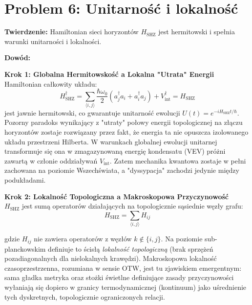 \documentclass[11pt,a4paper]{article}
\begin{document}
\bigskip

\section{Problem 6: Unitarność i lokalność}

\bigskip

\textbf{Twierdzenie:} Hamiltonian sieci horyzontów $H_{\text{SHZ}}$ jest hermitowski i spełnia warunki unitarności i lokalności.

\bigskip

\textbf{Dowód:}

\bigskip

\textbf{Krok 1: Globalna Hermitowskość a Lokalna "Utrata" Energii}\\

Hamiltonian całkowity układu:
\begin{equation}
H_{\text{SHZ}}^\dagger = \sum_{\langle i,j \rangle} \frac{\hbar\omega_0}{2}(a_j^\dagger a_i + a_i^\dagger a_j) + V_{\text{int}}^\dagger = H_{\text{SHZ}}
\end{equation}
jest jawnie hermitowski, co gwarantuje unitarność ewolucji $U(t) = e^{-iH_{\text{SHZ}}t/\hbar}$. Pozorny paradoks wynikający z "utraty" połowy energii topologicznej na złączu horyzontów zostaje rozwiązany przez fakt, że energia ta nie opuszcza izolowanego układu przestrzeni Hilberta. W warunkach globalnej ewolucji unitarnej transformuje się ona w zmagazynowaną energię kondensatu (VEV) próżni zawartą w członie oddziaływań $V_{\text{int}}$. Zatem mechanika kwantowa zostaje w pełni zachowana na poziomie Wszechświata, a "dyssypacja" zachodzi jedynie między podukładami.

\bigskip

\textbf{Krok 2: Lokalność Topologiczna a Makroskopowa Przyczynowość}\\

$H_{\text{SHZ}}$ jest sumą operatorów działających na topologicznie sąsiednie węzły grafu:
\begin{equation}
H_{\text{SHZ}} = \sum_{\langle i,j \rangle} H_{ij}
\end{equation}

gdzie $H_{ij}$ nie zawiera operatorów z węzłów $k \notin \{i,j\}$. Na poziomie sub-planckowskim definiuje to ścisłą \textit{lokalność topologiczną} (brak sprzężeń pozadiagonalnych dla nielokalnych krawędzi). Makroskopowa lokalność czasoprzestrzenna, rozumiana w sensie OTW, jest tu zjawiskiem emergentnym: sama gładka metryka oraz stożki świetlne definiujące zasady przyczynowości wyłaniają się dopiero w granicy termodynamicznej (kontinuum) jako uśrednienie tych dyskretnych, topologicznie ograniczonych relacji.
\end{document}
